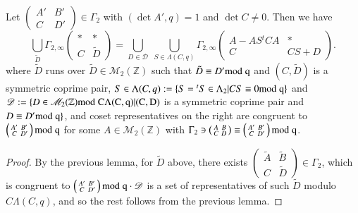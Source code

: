 \begin{sublemma}\label{c1:lem-1.5.4}
Let $\left(\begin{smallmatrix} A' & B'\\ C & D'
\end{smallmatrix}\right)\in\Gamma_{2}$ with $(\det A',q)=1$ and $\det
C\neq 0$. Then we have
$$
\bigcup_{\tilde{D}}\Gamma_{2,\infty}
\begin{pmatrix}
\ast & \ast\\
C & \tilde{D}
\end{pmatrix}
=\bigcup_{D\in\mathscr{D}} \; 
\bigcup_{S\in\Lambda(C,q)}\Gamma_{2,\infty}
\begin{pmatrix}
A-AS{}^{t}CA & \ast\\
C & CS+D
\end{pmatrix}.
$$
where $\tilde{D}$ runs over $\tilde{D}\in
\mathscr{M}_{2}(\mathbb{Z})$ such that $\tilde{D}\equiv D'\rm{mod} \; q$
and $(C,\tilde{D})$ is a symmetric coprime pair,
$S\in\Lambda(C,q):=\{S={}^{t}S\in \Lambda_{2}|CS\equiv 0\rm{mod} \; q\}$ and
$\mathscr{D}:=\{D\in \mathscr{M}_{2}(\mathbb{Z})\rm{mod} \;
C\Lambda(C,q)|(C,D)$ is a symmetric coprime pair and $D\equiv D'\rm{mod} \;
q\}$, and coset representatives on the right are congruent to
$\left(\begin{smallmatrix} A' & B'\\ C & D'
\end{smallmatrix}\right)\rm{mod} \; q$ for some
$A\in\mathscr{M}_{2}(\mathbb{Z})$ with $\Gamma_{2}\ni
\left(\begin{smallmatrix} A & B\\ C & D
\end{smallmatrix}\right)\equiv \left(\begin{smallmatrix} A' & B'\\ C &
  D'
\end{smallmatrix}\right)\rm{mod} \; q$.
\end{sublemma}

\begin{proof}
By the previous lemma, for $\tilde{D}$ above, there exists
$\left(\begin{smallmatrix} \tilde{A} & \tilde{B}\\ C
  &\tilde{D}
\end{smallmatrix}\right)\in\Gamma_{2}$, which is congruent to
$\left(\begin{smallmatrix} A' & B'\\ C & D'
\end{smallmatrix}\right)\rm{mod} \; q\cdot \mathscr{D}$ is a set of
representatives of such $\tilde{D}$ modulo $C\Lambda(C,q)$, and so
the rest follows from the previous lemma.
\end{proof}

